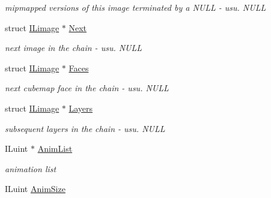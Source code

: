 \begin{DoxyCompactItemize}
\begin{DoxyCompactList}\small\item\em mipmapped versions of this image terminated by a N\+U\+L\+L -\/ usu. N\+U\+L\+L \end{DoxyCompactList}\item 
\hypertarget{struct_i_limage_adbd033e6e25af697caa549be3deeb5ff}{struct \hyperlink{struct_i_limage}{I\+Limage} $\ast$ \hyperlink{struct_i_limage_adbd033e6e25af697caa549be3deeb5ff}{Next}}\label{struct_i_limage_adbd033e6e25af697caa549be3deeb5ff}

\begin{DoxyCompactList}\small\item\em next image in the chain -\/ usu. N\+U\+L\+L \end{DoxyCompactList}\item 
\hypertarget{struct_i_limage_a42b8f93f02ab5e6c9623967a08e2d013}{struct \hyperlink{struct_i_limage}{I\+Limage} $\ast$ \hyperlink{struct_i_limage_a42b8f93f02ab5e6c9623967a08e2d013}{Faces}}\label{struct_i_limage_a42b8f93f02ab5e6c9623967a08e2d013}

\begin{DoxyCompactList}\small\item\em next cubemap face in the chain -\/ usu. N\+U\+L\+L \end{DoxyCompactList}\item 
\hypertarget{struct_i_limage_a504d31f6b9c9d6da656f5eecb57bdd46}{struct \hyperlink{struct_i_limage}{I\+Limage} $\ast$ \hyperlink{struct_i_limage_a504d31f6b9c9d6da656f5eecb57bdd46}{Layers}}\label{struct_i_limage_a504d31f6b9c9d6da656f5eecb57bdd46}

\begin{DoxyCompactList}\small\item\em subsequent layers in the chain -\/ usu. N\+U\+L\+L \end{DoxyCompactList}\item 
\hypertarget{struct_i_limage_ab128f3c35d0617202e3ec8252af5fa03}{I\+Luint $\ast$ \hyperlink{struct_i_limage_ab128f3c35d0617202e3ec8252af5fa03}{Anim\+List}}\label{struct_i_limage_ab128f3c35d0617202e3ec8252af5fa03}

\begin{DoxyCompactList}\small\item\em animation list \end{DoxyCompactList}\item 
\hypertarget{struct_i_limage_a70e6057f47ac13562d06c43e17f9be56}{I\+Luint \hyperlink{struct_i_limage_a70e6057f47ac13562d06c43e17f9be56}{Anim\+Size}}\label{struct_i_limage_a70e6057f47ac13562d06c43e17f9be56}


\end{DoxyCompactItemize}
